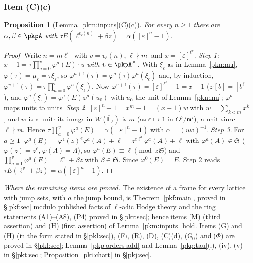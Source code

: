 \documentclass[10pt]{amsart}
\newtheorem{proposition}[theorem]{Proposition}
\theoremstyle{definition}
\theoremstyle{remark}
\begin{document}
\subsubsection{Item (C)(c)}\label{pkn:ss-Cc}

\begin{proposition}[Lemma~\ref{pkm:inputs}(C)(c)]\label{pkn:Cc}
For every $n\ge1$ there are $\alpha,\beta\in\pkpA$ with $\tau E(\ell^{v_\ell(n)}+\beta z)=
\alpha([\varepsilon]^n-1)$.
\end{proposition}

\begin{proof}
Write $n=m\ell^v$ with $v=v_\ell(n)$, $\ell\nmid m$, and $x=[\varepsilon]^{\ell^v}$.
\emph{Step 1: $x-1=\tau\prod_{a=0}^{v}\varphi^a(E)\cdot u$ with $u\in\pkpA^\times$.} With
$\xi_\varepsilon$ as in Lemma~\ref{pkn:mu}, $\varphi(\tau)=\mu_\varepsilon=\tau\xi_\varepsilon$, so
$\varphi^{a+1}(\tau)=\varphi^a(\tau)\varphi^a(\xi_\varepsilon)$ and, by induction,
$\varphi^{v+1}(\tau)=\tau\prod_{a=0}^v\varphi^a(\xi_\varepsilon)$. Now $\varphi^{v+1}(\tau)=[\varepsilon]^{\ell^v}-1
=x-1$ ($\varphi[b]=[b^\ell]$), and $\varphi^a(\xi_\varepsilon)=\varphi^a(E)\varphi^a(u_0)$ with $u_0$ the unit
of Lemma~\ref{pkn:mu}; $\varphi^a$ maps units to units.
\emph{Step 2.} $[\varepsilon]^n-1=x^m-1=(x-1)w$ with $w=\sum_{k<m}x^k$, and $w$ is a unit: its image in
$W(\overline{\mathbb F}_\ell)$ is $m$ (as $\varepsilon\mapsto1$ in $O^\flat/\mathfrak m^\flat$), a unit since
$\ell\nmid m$. Hence $\tau\prod_{a=0}^v\varphi^a(E)=\alpha([\varepsilon]^n-1)$ with $\alpha=(uw)^{-1}$.
\emph{Step 3.} For $a\ge1$, $\varphi^a(E)=\varphi^a(z)^e\varphi^a(A)+\ell=z^{e\ell^a}\varphi^a(A)+\ell$ with
$\varphi^a(A)\in\mathfrak S$ ($\varphi(z)=z^\ell$, $\varphi(\Lambda)=\Lambda$), so $\varphi^a(E)\equiv\ell
\pmod{z\mathfrak S}$ and $\prod_{a=1}^v\varphi^a(E)=\ell^v+\beta z$ with $\beta\in\mathfrak S$. Since
$\varphi^0(E)=E$, Step 2 reads $\tau E(\ell^v+\beta z)=\alpha([\varepsilon]^n-1)$.
\end{proof}

\emph{Where the remaining items are proved.} The existence of a frame for every lattice with jump
sets, with $a$ the jump bound, is Theorem~\ref{pkf:main}, proved in \S\ref{pkf:sec} modulo published
facts of $\ell$-adic Hodge theory and the ring statements (A1)--(A8), (P4) proved in \S\ref{pkr:sec};
hence items (M) (third assertion) and (H) (first assertion) of Lemma~\ref{pkm:inputs} hold. Items (G)
and (H) (in the form stated in \S\ref{pkl:sec}), (F), (R), (D), (C)(d), (G$_0$) and ($\Phi$) are proved in
\S\ref{pkl:sec}; Lemma~\ref{pkp:orders-add} and Lemma~\ref{pkp:tau}(i), (iv), (v) in \S\ref{pkt:sec};
Proposition~\ref{pki:chart} in \S\ref{pkj:sec}.
\end{document}
